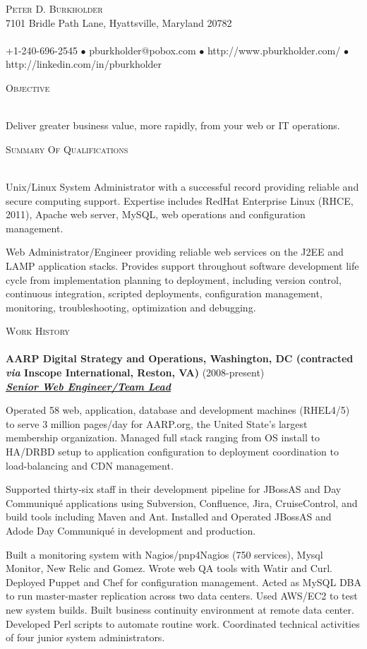 \documentclass{article}
\newcommand{\lineunder}{\vspace*{-8pt} \\ \hspace*{-18pt} \hrulefill \\}
\newcommand{\header}[1]{{\hspace*{-15pt}\vspace*{6pt} \textsc{#1}} \vspace*{-6pt} \lineunder}
\newcommand{\employer}[3]{{ \textbf{#1} (#2)\\ \underline{\textbf{\emph{#3}}}\\ \nopagebreak }}
\newcommand{\contact}[3]{
    \vspace*{-8pt}
    \begin{center}
        {\LARGE \scshape {#1}}\\
        #2 \lineunder 
        #3
    \end{center}
    \vspace*{-8pt}
}
\newenvironment{achievements}{\begin{list}{\topsep 0pt \itemsep -2pt}} {\vspace*{4pt}\end{list}}
\begin{document}
\smallskip
\vspace*{-44pt}

\contact{Peter D. Burkholder}
{7101 Bridle Path Lane, Hyattsville, Maryland 20782}
{+1-240-696-2545 $\bullet$ pburkholder@pobox.com  $\bullet$ http://www.pburkholder.com/ $\bullet$ http://linkedin.com/in/pburkholder }

\header{Objective}
\begin{achievements}
    \item Deliver greater business value, more rapidly, from your web or IT operations.
\end{achievements}

\header{Summary Of Qualifications}
\begin{achievements}
    \item Unix/Linux System Administrator with a successful record providing reliable and secure computing support. Expertise includes RedHat Enterprise Linux (RHCE, 2011), Apache web server, MySQL, web operations and configuration management.
    \item Web Administrator/Engineer providing reliable web services on the J2EE and LAMP application stacks.  Provides support throughout software development life cycle from implementation planning to deployment, including version control, continuous integration, scripted deployments, configuration management, monitoring, troubleshooting, optimization and debugging.
\end{achievements}

\header{Work History}
\employer{AARP Digital Strategy and Operations, Washington, DC (contracted \emph{via} Inscope International, Reston, VA)}{2008-present}{Senior Web Engineer/Team Lead}
\begin{achievements}
  \item Operated 58 web, application, database and development machines (RHEL4/5) to serve 3 million pages/day for AARP.org, the United State's largest membership organization.  Managed full stack ranging from OS install to HA/DRBD setup to application configuration to deployment coordination to load-balancing and CDN management. 
  \item Supported thirty-six staff in their development pipeline for JBossAS and Day Communiqu\'{e} applications using Subversion, Confluence, Jira, CruiseControl, and build tools including Maven and Ant.  Installed and Operated JBossAS and Adode Day Communiqu\'{e} in development and production.
  \item Built a monitoring system with Nagios/pnp4Nagios (750 services), Mysql Monitor, New Relic and Gomez.  Wrote web QA tools with Watir and Curl. Deployed Puppet and Chef for configuration management. Acted as MySQL DBA to run master-master replication across two data centers. Used AWS/EC2 to test new system builds. Built business continuity environment at remote data center. Developed Perl scripts to automate routine work.  Coordinated technical activities of four junior system administrators.
\end{achievements}
\end{document}
